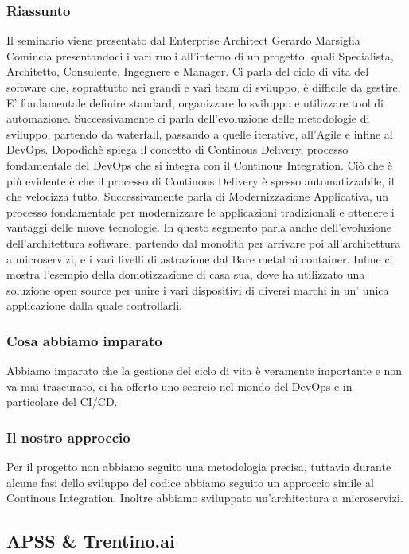 \documentclass{report}
\begin{document}
\subsubsection*{Riassunto}
Il seminario viene presentato dal Enterprise Architect Gerardo Marsiglia
Comincia presentandoci i vari ruoli all'interno di un progetto, quali Specialista, Architetto, Consulente, Ingegnere e Manager.
Ci parla del ciclo di vita del software che, soprattutto nei grandi e vari team di sviluppo, è difficile da gestire. E' fondamentale definire standard, organizzare lo sviluppo e utilizzare tool di automazione.
Successivamente ci parla dell'evoluzione delle metodologie di sviluppo, partendo da waterfall, passando a quelle iterative, all'Agile e infine al DevOps.
Dopodichè spiega il concetto di Continous Delivery, processo fondamentale del DevOps che si integra con il Continous Integration. 
Ciò che è più evidente è che il processo di Continous Delivery è spesso automatizzabile, il che velocizza tutto.
Successivamente parla di Modernizzazione Applicativa, un processo fondamentale per modernizzare le applicazioni tradizionali e ottenere i vantaggi delle nuove tecnologie.
In questo segmento parla anche dell'evoluzione dell'architettura software, partendo dal monolith per arrivare poi all'architettura a microservizi, e i vari livelli di astrazione dal Bare metal ai container.
Infine ci mostra l'esempio della domotizzazione di casa sua, dove ha utilizzato una soluzione open source per unire i vari dispositivi di diversi marchi in un' unica applicazione dalla quale controllarli.

\subsubsection*{Cosa abbiamo imparato}
Abbiamo imparato che la gestione del ciclo di vita è veramente importante e non va mai trascurato, ci ha offerto uno scorcio nel mondo del DevOps e in particolare del CI/CD.
\subsubsection*{Il nostro approccio}
Per il progetto non abbiamo seguito una metodologia precisa, tuttavia durante alcune fasi dello sviluppo del codice abbiamo seguito un approccio simile al Continous Integration.
Inoltre abbiamo sviluppato un'architettura a microservizi.
\subsection{APSS \& Trentino.ai}
\end{document}
